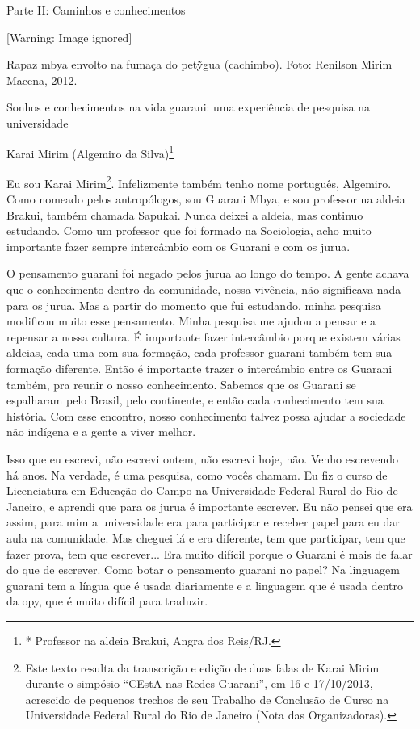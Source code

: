 \documentclass{article}
\begin{document}
Parte II: Caminhos e conhecimentos

  [Warning: Image ignored] %
 

Rapaz mbya envolto na fuma\c{c}a do pet\~{y}gua (cachimbo). Foto:
Renilson Mirim Macena, 2012.

Sonhos e conhecimentos na vida guarani: uma experi\^encia de pesquisa na
universidade

Karai Mirim (Algemiro da Silva)\footnote{* Professor na aldeia Brakui,
Angra dos Reis/RJ.} 

Eu sou Karai Mirim\footnote{ Este texto resulta da transcri\c{c}\~ao e
edi\c{c}\~ao de duas falas de Karai Mirim durante o simp\'osio
{\textquotedblleft}CEstA nas Redes Guarani{\textquotedblright}, em 16 e
17/10/2013, acrescido de pequenos trechos de seu Trabalho de
Conclus\~ao de Curso na Universidade Federal Rural do Rio de Janeiro
(Nota das Organizadoras).}. Infelizmente tamb\'em tenho nome
portugu\^es, Algemiro. Como nomeado pelos antrop\'ologos, sou Guarani
Mbya, e sou professor na aldeia Brakui, tamb\'em chamada Sapukai. Nunca
deixei a aldeia, mas continuo estudando. Como um professor que foi
formado na Sociologia, acho muito importante fazer sempre interc\^ambio
com os Guarani e com os jurua.

O pensamento guarani foi negado pelos jurua ao longo do tempo. A gente
achava que o conhecimento dentro da comunidade, nossa viv\^encia, n\~ao
significava nada para os jurua. Mas a partir do momento que fui
estudando, minha pesquisa modificou muito esse pensamento. Minha
pesquisa me ajudou a pensar e a repensar a nossa cultura. \'E
importante fazer interc\^ambio porque existem v\'arias aldeias, cada
uma com sua forma\c{c}\~ao, cada professor guarani tamb\'em tem sua
forma\c{c}\~ao diferente. Ent\~ao \'e importante trazer o interc\^ambio
entre os Guarani tamb\'em, pra reunir o nosso conhecimento. Sabemos que
os Guarani se espalharam pelo Brasil, pelo continente, e ent\~ao cada
conhecimento tem sua hist\'oria. Com esse encontro, nosso conhecimento
talvez possa ajudar a sociedade n\~ao ind\'igena e a gente a viver
melhor.

Isso que eu escrevi, n\~ao escrevi ontem, n\~ao escrevi hoje, n\~ao.
Venho escrevendo h\'a anos. Na verdade, \'e uma pesquisa, como voc\^es
chamam. Eu fiz o curso de Licenciatura em Educa\c{c}\~ao do Campo na
Universidade Federal Rural do Rio de Janeiro, e aprendi que para os
jurua \'e importante escrever. Eu n\~ao pensei que era assim, para mim
a universidade era para participar e receber papel para eu dar aula na
comunidade. Mas cheguei l\'a e era diferente, tem que participar, tem
que fazer prova, tem que escrever... Era muito dif\'icil porque o
Guarani \'e mais de falar do que de escrever. Como botar o pensamento
guarani no papel? Na linguagem guarani tem a l\'ingua que \'e usada
diariamente e a linguagem que \'e usada dentro da opy, que \'e muito
dif\'icil para traduzir.
\end{document}
